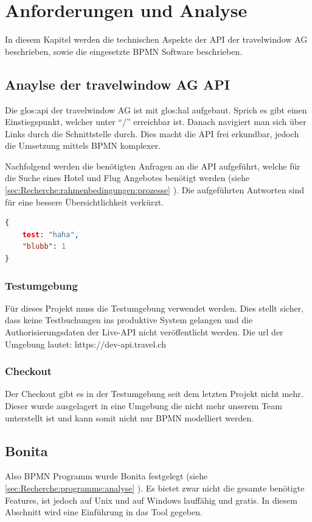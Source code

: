 

\chapter{Anforderungen und Analyse}
\label{sec:analyse}
In diesem Kapitel werden die technischen Aspekte der API der travelwindow AG beschrieben, sowie die eingesetzte BPMN Software beschrieben.

\section{Anaylse der travelwindow AG API}
\label{sec:analyse:api}
Die \Gls{glos:api} der travelwindow AG ist mit \Gls{glos:hal} aufgebaut. Sprich es gibt einen Einstiegspunkt, welcher unter "`/"' erreichbar ist. Danach navigiert man sich über Links durch die Schnittstelle durch. Dies macht die API frei erkundbar, jedoch die Umsetzung mittels BPMN komplexer.

Nachfolgend werden die benötigten Anfragen an die API aufgeführt, welche für die Suche eines Hotel und Flug Angebotes benötigt werden (siehe \cref{sec:Recherche:rahmenbedingungen:prozesse} ). Die aufgeführten Antworten sind für eine bessere Übersichtlichkeit verkürzt.


\begin{lstlisting}[language=json,firstnumber=1]
{
	test: "haha",
	"blubb": 1
}
\end{lstlisting}

\subsection{Testumgebung}
Für dieses Projekt muss die Testumgebung verwendet werden. Dies stellt sicher, dass keine Testbuchungen ins produktive System gelangen und die Authorisierungsdaten der Live-API nicht veröffentlicht werden.
Die \gls{url} der Umgebung lautet: https://dev-api.travel.ch

\subsection{Checkout}
Der Checkout gibt es in der Testumgebung seit dem letzten Projekt nicht mehr. Dieser wurde ausgelagert in eine Umgebung die nicht mehr unserem Team unterstellt ist und kann somit nicht nur BPMN modelliert werden.

\section{Bonita}
Also BPMN Programm wurde Bonita festgelegt (siehe \cref{sec:Recherche:programme:analyse} ). Es bietet zwar nicht die gesamte benötigte Features, ist jedoch auf Unix und auf Windows lauffähig und gratis. In diesem Abschnitt wird eine Einführung in das Tool gegeben. 

